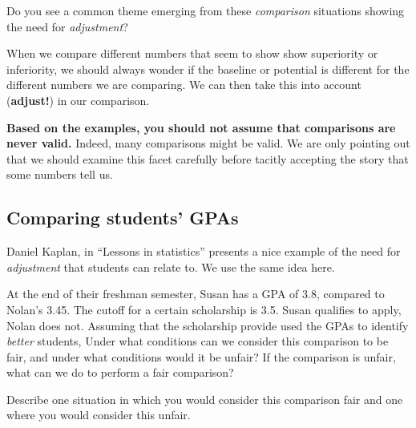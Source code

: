 \documentclass[
  12pt,
  letterpaper,
  DIV=11,
  numbers=noendperiod]{scrreprt}
\begin{document}
\begin{tcolorbox}[enhanced jigsaw, colback=white, leftrule=.75mm, toprule=.15mm, bottomtitle=1mm, breakable, coltitle=black, toptitle=1mm, title=\textcolor{quarto-callout-tip-color}{\faLightbulb}\hspace{0.5em}{Tip}, opacitybacktitle=0.6, colbacktitle=quarto-callout-tip-color!10!white, arc=.35mm, left=2mm, colframe=quarto-callout-tip-color-frame, titlerule=0mm, rightrule=.15mm, bottomrule=.15mm, opacityback=0]

Do you see a common theme emerging from these \emph{comparison}
situations showing the need for \emph{adjustment}?

When we compare different numbers that seem to show show superiority or
inferiority, we should always wonder if the baseline or potential is
different for the different numbers we are comparing. We can then take
this into account (\textbf{adjust!}) in our comparison.

\textbf{Based on the examples, you should not assume that comparisons
are never valid.} Indeed, many comparisons might be valid. We are only
pointing out that we should examine this facet carefully before tacitly
accepting the story that some numbers tell us.

\end{tcolorbox}

\subsection{Comparing students' GPAs}\label{comparing-students-gpas}

Daniel Kaplan, in ``Lessons in statistics'' presents a nice example of
the need for \emph{adjustment} that students can relate to. We use the
same idea here.

At the end of their freshman semester, Susan has a GPA of 3.8, compared
to Nolan's 3.45. The cutoff for a certain scholarship is 3.5. Susan
qualifies to apply, Nolan does not. Assuming that the scholarship
provide used the GPAs to identify \emph{better} students, Under what
conditions can we consider this comparison to be fair, and under what
conditions would it be unfair? If the comparison is unfair, what can we
do to perform a fair comparison?

\begin{tcolorbox}[enhanced jigsaw, colback=white, leftrule=.75mm, toprule=.15mm, bottomtitle=1mm, breakable, coltitle=black, toptitle=1mm, title={Quick Check}, opacitybacktitle=0.6, colbacktitle=quarto-callout-note-color!10!white, arc=.35mm, left=2mm, colframe=quarto-callout-note-color-frame, titlerule=0mm, rightrule=.15mm, bottomrule=.15mm, opacityback=0]

Describe one situation in which you would consider this comparison fair
and one where you would consider this unfair.

\end{tcolorbox}
\end{document}
